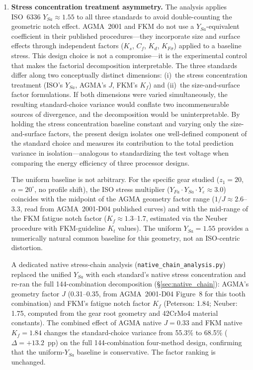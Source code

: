 \documentclass[twocolumn,12pt,a4paper]{article}
\begin{document}
\begin{enumerate}
  \item \textbf{Stress concentration treatment asymmetry.} The analysis
        applies ISO~6336 $Y_{Sa} \approx 1.55$ to all three standards to
        avoid double-counting the geometric notch effect. AGMA~2001
        and FKM do not use a $Y_{Sa}$-equivalent coefficient in their
        published procedures---they incorporate size and surface effects
        through independent factors ($K_s$, $C_f$, $K_d$, $K_{F\sigma}$)
        applied to a baseline stress. This design choice is not a
        compromise---it is the experimental control that makes the
        factorial decomposition interpretable. The three standards differ
        along two conceptually distinct dimensions: (i)~the stress
        concentration treatment (ISO's $Y_{Sa}$, AGMA's $J$, FKM's
        $K_f$) and (ii)~the size-and-surface factor formulations. If both
        dimensions were varied simultaneously, the resulting
        standard-choice variance would conflate two incommensurable sources
        of divergence, and the decomposition would be uninterpretable. By
        holding the stress concentration baseline constant and varying only
        the size-and-surface factors, the present design isolates one
        well-defined component of the standard choice and measures its
        contribution to the total prediction variance in
        isolation---analogous to standardizing the test voltage when
        comparing the energy efficiency of three processor designs.

        The uniform baseline is not arbitrary. For the specific gear
        studied ($z_1=20$, $\alpha=20^\circ$, no profile shift), the
        ISO stress multiplier ($Y_{Fa} \cdot Y_{Sa} \cdot Y_\varepsilon
        \approx 3.0$) coincides with the midpoint of the AGMA geometry
        factor range ($1/J \approx 2.6$--3.3, read from AGMA~2001-D04
        published curves) and with the mid-range of the FKM fatigue notch
        factor ($K_f \approx 1.3$--1.7, estimated via the Neuber
        procedure with FKM-guideline $K_t$ values). The uniform
        $Y_{Sa}=1.55$ provides a numerically natural common baseline
        for this geometry, not an ISO-centric distortion.

        A dedicated native stress-chain analysis
        (\texttt{native\_chain\_analysis.py}) replaced the unified
        $Y_{Sa}$ with each standard's native stress concentration and
        re-ran the full 144-combination decomposition (\S\ref{sec:native_chain}):
        AGMA's geometry factor $J$ (0.31--0.35, from AGMA~2001-D04
        Figure~8 for this tooth combination) and FKM's fatigue notch
        factor $K_f$ (Peterson: 1.84; Neuber: 1.75, computed from the
        gear root geometry and 42CrMo4 material constants). The combined
        effect of AGMA native $J=0.33$ and FKM native $K_f=1.84$ changes
        the standard-choice variance from 55.3\% to 68.5\%
        ($\Delta = +13.2$~pp) on the full 144-combination
        four-method design, confirming
        that the uniform-$Y_{Sa}$ baseline is conservative. The factor
        ranking is unchanged.


\end{enumerate}
\end{document}
